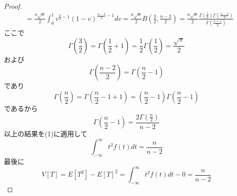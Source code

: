 \begin{proof}
\begin{align*}
                &= \frac{n\sqrt{n}}{2}\int_{0}^{1}{v^{\frac{3}{2}-1}(1-v)^{\frac{n-2}{2}-1} dv} = \frac{n\sqrt{n}}{2}B\left(\frac{3}{2},\frac{n-2}{2}\right) = \frac{n\sqrt{n}}{2}\frac{\Gamma{\left(\frac{3}{2}\right)}\Gamma{\left(\frac{n-2}{2}\right)}}{\Gamma{\left(\frac{n+1}{2}\right)}}
            \end{align*}
            ここで
            \[\Gamma{\left(\frac{3}{2}\right)} = \Gamma{\left(\frac{1}{2}+1\right)} = \frac{1}{2}\Gamma{\left(\frac{1}{2}\right)} = \frac{\sqrt{\pi}}{2}\]
            および
            \[\Gamma{\left(\frac{n-2}{2}\right)} = \Gamma{\left(\frac{n}{2}-1\right)}\]
            であり
            \[\Gamma{\left(\frac{n}{2}\right)} = \Gamma{\left(\frac{n}{2}-1+1\right)} = \left(\frac{n}{2}-1\right)\Gamma{\left(\frac{n}{2}-1\right)}\]
            であるから
            \[\Gamma{\left(\frac{n}{2}-1\right)} = \frac{2\Gamma{\left(\frac{n}{2}\right)}}{n-2}\]
            以上の結果を(1)に適用して
            \[\int_{-\infty}^{\infty}{t^2f(t) dt} = \frac{n}{n-2}\]
            最後に
            \[V[T] = E[T^2] - {E[T]}^2 = \int_{-\infty}^{\infty}{t^2f(t) dt} - 0 = \frac{n}{n-2}\]
        \end{proof}